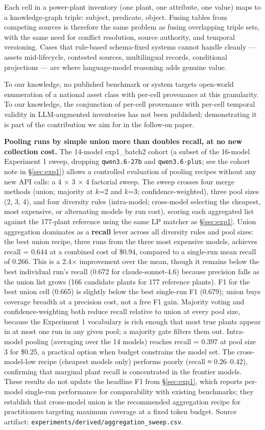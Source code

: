\documentclass[a4paper,11pt]{article}
\begin{document}
Each cell in a power-plant inventory (one plant, one attribute, one
value) maps to a knowledge-graph triple: subject, predicate, object.
Fusing tables from competing sources is therefore the same problem as
fusing overlapping triple sets, with the same need for conflict
resolution, source authority, and temporal versioning. Cases that
rule-based schema-fixed systems cannot handle cleanly --- assets
mid-lifecycle, contested sources, multilingual records, conditional
projections --- are where language-model reasoning adds genuine value.

To our knowledge, no published benchmark or system targets open-world
enumeration of a national asset class with per-cell provenance at this
granularity. To our knowledge, the conjunction of per-cell provenance
with per-cell temporal validity in LLM-augmented inventories has not
been published; demonstrating it is part of the contribution we aim for
in the follow-on paper.

\textbf{Pooling runs by simple union more than doubles recall, at no new
collection cost.} The 14-model exp1\_batch2 cohort (a subset of the
16-model Experiment 1 sweep, dropping \texttt{qwen3.6-27b} and
\texttt{qwen3.6-plus}; see the cohort note in §\ref{sec:exp1}) allows a
controlled evaluation of pooling recipes without any new API calls: a 4
× 3 × 4 factorial sweep. The sweep crosses four merge methods (union;
majority at \(k\)=2 and \(k\)=3; confidence-weighted), three pool sizes
(2, 3, 4), and four diversity rules (intra-model; cross-model selecting
the cheapest, most expensive, or alternating models by run cost),
scoring each aggregated list against the 177-plant reference using the
same LP matcher as §\ref{sec:exp1}. Union aggregation dominates as a
\textbf{recall} lever across all diversity rules and pool sizes: the
best union recipe, three runs from the three most expensive models,
achieves recall = 0.644 at a combined cost of \$0.94, compared to a
single-run mean recall of 0.266. This is a 2.4× improvement over the
mean, though it remains below the best individual run's recall (0.672
for claude-sonnet-4.6) because precision falls as the union list grows
(166 candidate plants for 177 reference plants). F1 for the best union
cell (0.665) is slightly below the best single-run F1 (0.679); union
buys coverage breadth at a precision cost, not a free F1 gain. Majority
voting and confidence-weighting both reduce recall relative to union at
every pool size, because the Experiment 1 vocabulary is rich enough that
most true plants appear in at most one run in any given pool; a majority
gate filters them out. Intra-model pooling (averaging over the 14
models) reaches recall = 0.397 at pool size 3 for \$0.25, a practical
option when budget constrains the model set. The cross-model-low recipe
(cheapest models only) performs poorly (recall ≈ 0.26--0.42), confirming
that marginal plant recall is concentrated in the frontier models. These
results do not update the headline F1 from §\ref{sec:exp1}, which
reports per-model single-run performance for comparability with existing
benchmarks; they establish that cross-model union is the recommended
aggregation recipe for practitioners targeting maximum coverage at a
fixed token budget. Source artifact:
\texttt{experiments/derived/aggregation\_sweep.csv}.
\end{document}
